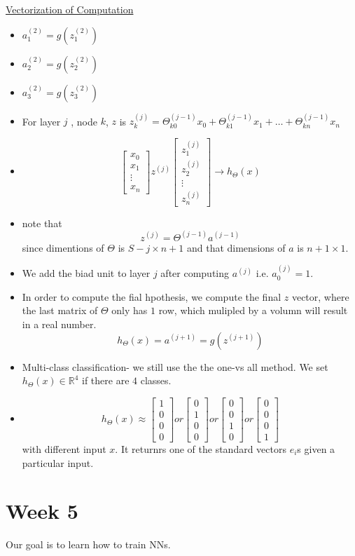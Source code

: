 \documentclass[12pt]{article}
\begin{document}
\underline{Vectorization of Computation}

\begin{itemize}
	\item $a_1^{(2)} = g(z_1^{(2)})$
	\item $a_2^{(2)} = g(z_2^{(2)})$
	\item $a_3^{(2)} = g(z_3^{(2)})$
	\item For layer $j$ , node $k$, $z$ is $z_k^{(j)} = \Theta_{k0}^{(j-1)}x_0 + \Theta_{k1}^{(j-1)}x_1+\ldots + \Theta_{kn}^{(j-1)}x_n$
	\item 
	$$  \begin{bmatrix}
	x_0 \\
	x_1 \\
	\vdots\\
	x_n \end{bmatrix}
	z^{(j)}
	\left[
	\begin{array}{ccc} 
	z_1^{(j)}\\
	z_2^{(j)} \\
	\vdots\\
	z_n^{(j)} 
	\end{array}
	\right]
	\to h_\Theta(x)
	$$
	\item note that \[z^{(j)} = \Theta^{(j-1)}a^{(j-1)}\] since dimentions of $\Theta$ is $S-j\times n+1$ and that dimensions of $a$ is $n+1\times 1$.
	\item We add the biad unit to layer $j$ after computing $a^{(j)}$ i.e. $a_0^{(j)} = 1$.
	\item In order to compute the fial hpothesis, we compute the final $z$ vector, where the last matrix of $\Theta$ only has $1$ row, which mulipled by a volumn will result in a real number. \[h_\Theta(x) = a^{(j+1)}=g(z^{(j+1)})\]
	\item Multi-class classification- we still use the the one-vs all method. We set $h_\Theta(x)\in\mathbb{R}^4$ if there are $4$ classes. \\
	\item \[h_\Theta(x) \approx \left[\begin{array}{ccc} 
	1\\
	0\\
	0\\
	0
	\end{array}  \right]
	or 
	\left[\begin{array}{ccc} 
		0\\
		1\\
		0\\
		0
	\end{array}  \right]
   or \left[ \begin{array}{ccc} 
   	0\\
   	0\\
   	1\\
   	0
   \end{array}  \right]
or \left[ \begin{array}{ccc} 
	0\\
	0\\
	0\\
	1
	\end{array} \right] \]  with different input $x$. It returnrs one of the standard vectors $e_i$s given a particular input.
\end{itemize}

\section*{Week 5}
Our goal is to learn how to train NNs.
\end{document}
